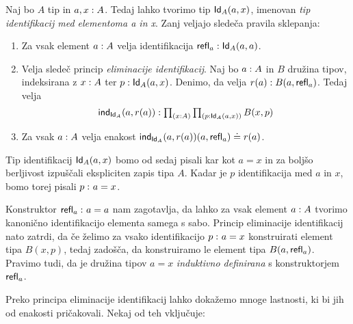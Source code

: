 \begin{definicija}
  Naj bo \(A\) tip in \({a, x : A}\). Tedaj lahko tvorimo tip
  \(\textnormal{\textsf{Id}}_{A}(a, x)\),
  imenovan \emph{tip identifikacij med elementoma a in x}. Zanj veljajo sledeča pravila
  sklepanja:
  \begin{enumerate}
  \item Za vsak element \({a : A}\) velja identifikacija
    \({\textnormal{\textsf{refl}}_{a} : \textnormal{\textsf{Id}}_{A}(a, a)}\).
  \item Velja sledeč princip \emph{eliminacije identifikacij}.
    Naj bo \({a : A}\) in \(B\) družina tipov, indeksirana z
    \({x : A}\) ter \({p : \textnormal{\textsf{Id}}_{A}(a, x)}\). Denimo, da velja
    \({r(a) : B(a, \textnormal{\textsf{refl}}_{a})}\). Tedaj velja
    \[{\textnormal{\textsf{ind}}_{\textnormal{\textsf{Id}}_{A}}(a, r(a)) : \textstyle \prod_{\left( {x : A} \right)} \textstyle \prod_{\left( {p : \textnormal{\textsf{Id}}_{A}(a, x)} \right)} B(x, p)}\]
  \item Za vsak \({a : A}\) velja enakost
    \(\textnormal{\textsf{ind}}_{\textnormal{\textsf{Id}}_{A}}(a, r(a))(a, \textnormal{\textsf{refl}}_{a}) \doteq r(a)\).
  \end{enumerate}
  Tip identifikacij \(\textnormal{\textsf{Id}}_{A}(a, x)\) bomo od sedaj pisali kar kot \(a = x\) in za boljšo
  berljivost izpuščali ekspliciten zapis tipa \(A\). Kadar je \(p\) identifikacija
  med \(a\) in \(x\), bomo torej pisali \(p \,\colon a = x\).

  Konstruktor \(\textnormal{\textsf{refl}}_{a} \,\colon a = a\)
  nam zagotavlja, da lahko za vsak element \({a : A}\) tvorimo kanonično
  identifikacijo elementa samega s sabo. Princip eliminacije identifikacij nato zatrdi,
  da če želimo za vsako identifikacijo \(p \,\colon a = x\) konstruirati element tipa
  \(B(x, p)\), tedaj zadošča, da konstruiramo le element tipa \(B(a, \textnormal{\textsf{refl}}_{a})\).
  Pravimo tudi, da je družina tipov \(a = x\) \emph{induktivno definirana} s
  konstruktorjem \(\textnormal{\textsf{refl}}_{a}\).
\end{definicija}

Preko principa eliminacije identifikacij lahko dokažemo mnoge lastnosti, ki bi jih od enakosti pričakovali. Nekaj od teh vključuje:


